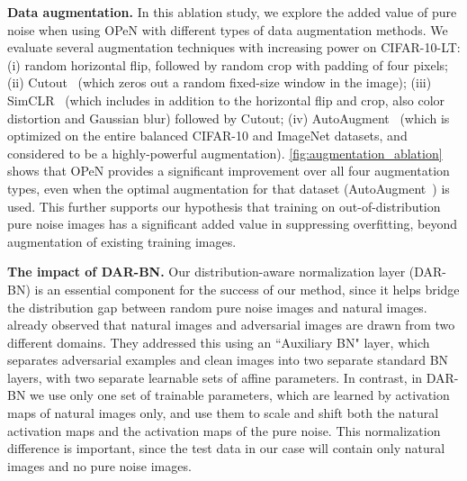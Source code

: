 \documentclass[nohyperref]{article}
\theoremstyle{plain}
\theoremstyle{definition}
\theoremstyle{remark}
\begin{document}
\vspace*{-0.1cm}
\noindent\textbf{Data augmentation.} 
In this ablation study, we explore the added value of pure noise when using OPeN with different types of data augmentation methods. We evaluate several augmentation techniques with increasing power on CIFAR-10-LT: (i) random horizontal flip, followed by random crop with padding of four pixels; (ii) Cutout~\cite{devries2017improved} (which zeros out a random fixed-size window in the image); (iii) SimCLR~\cite{chen2020simple} (which includes in addition to the horizontal flip and crop, also color distortion and Gaussian blur) followed by Cutout; (iv) AutoAugment~\cite{cubuk2019autoaugment} (which is optimized on the {entire balanced} CIFAR-10 and ImageNet datasets, and considered to be a highly-powerful augmentation). \cref{fig:augmentation_ablation} shows that OPeN provides a significant improvement over all four augmentation types, even when the optimal augmentation for that dataset (AutoAugment~\cite{cubuk2019autoaugment}) is used. This further supports our hypothesis that training on out-of-distribution pure noise images has a significant added value in suppressing overfitting, beyond augmentation of existing training images.

\noindent\textbf{The impact of DAR-BN.} 
Our distribution-aware normalization layer (DAR-BN) is an essential component for the success of our method, since it helps bridge the distribution gap between random pure noise images and natural images. 
\cite{xie2019intriguing, xie2020adversarial} already observed that natural images and adversarial images are drawn from two different domains.
They addressed this using an ``Auxiliary BN" layer, which separates  adversarial examples and clean images into two separate standard BN layers, with two separate learnable sets of affine parameters. In contrast, in DAR-BN we use only one set of trainable parameters, which are learned by activation maps of natural images only, and use them to scale and shift both the natural activation maps and the activation maps of the pure noise.
This normalization difference is important, since the test data in our case will  contain only natural images and no pure noise images.
\end{document}
